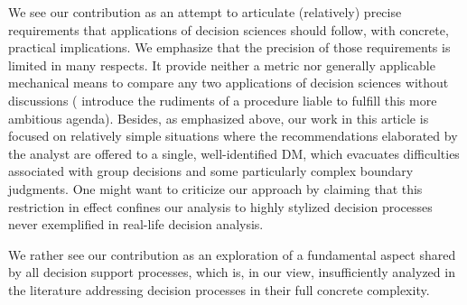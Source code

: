 \documentclass[preprint, french, english, 11pt, authoryear]{elsarticle}%
\newcommand{\ac}[1]{#1}
\begin{document}
We see our contribution as an attempt to articulate (relatively) precise requirements that applications of decision sciences should follow, with concrete, practical implications. We emphasize that the precision of those requirements is limited in many respects.
It provide neither a metric nor generally applicable mechanical means to compare any two applications of decision sciences without discussions (\citet{cailloux_formal_2018} introduce the rudiments of a procedure liable to fulfill this more ambitious agenda).
Besides, as emphasized above, our work in this article is focused on relatively simple situations where the recommendations elaborated by the analyst are offered to a single, well-identified \ac{DM}, which evacuates difficulties associated with group decisions and some particularly complex boundary judgments.
One might want to criticize our approach by claiming that this restriction in effect confines our analysis to highly stylized decision processes never exemplified in real-life decision analysis.
\begin{changebar}We rather see our contribution as an exploration of a fundamental aspect shared by all decision support processes, which is, in our view, insufficiently analyzed in the literature addressing decision processes in their full concrete complexity.\end{changebar}
\end{document}
